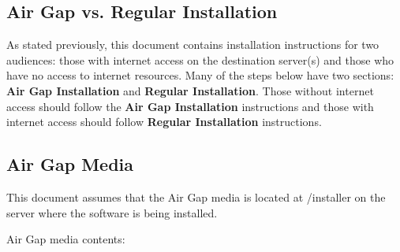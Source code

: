 \documentclass[letterpaper,10pt,openany,oneside]{sphinxmanual}
\begin{document}
\subsection{Air Gap vs. Regular Installation}
\label{AnacondaEnterpriseNotebooks:air-gap-vs-regular-installation}
As stated previously, this document contains installation instructions
for two audiences: those with internet access on the destination
server(s) and those who have no access to internet resources. Many of
the steps below have two sections: \textbf{Air Gap Installation} and
\textbf{Regular Installation}. Those without internet access should follow
the \textbf{Air Gap Installation} instructions and those with internet access
should follow \textbf{Regular Installation} instructions.


\subsection{Air Gap Media}
\label{AnacondaEnterpriseNotebooks:air-gap-media}
This document assumes that the Air Gap media is located at /installer on
the server where the software is being installed.

Air Gap media contents:
\end{document}
